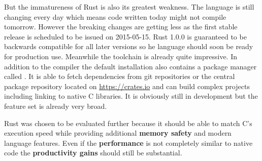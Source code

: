 But the immatureness of Rust is also its greatest weakness. The language is still changing every day which means code written today might not compile tomorrow. However the breaking changes are getting less as the first stable release is scheduled to be issued on 2015-05-15. Rust 1.0.0 is guaranteed to be backwards compatible for all later versions so he language should soon be ready for production use. Meanwhile the toolchain is already quite impressive. In addition to the compiler the default installation also contains a package manager called . It is able to fetch dependencies from git repositories or the central package repository located on \url{https://crates.io} and can build complex projects including linking to native C libraries. It is obviously still in development but the feature set is already very broad.

Rust was chosen to be evaluated further because it should be able to match C's execution speed while providing additional \textbf{memory safety} and modern language features. Even if the \textbf{performance} is not completely similar to native code the \textbf{productivity gains} should still be substantial.
